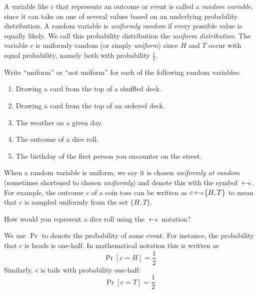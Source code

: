 A variable like $c$ that represents an outcome or event is called a \emph{random 
variable}, since it can take on one of several values based on an underlying 
probability distribution. A random variable is \emph{uniformly random} if every possible 
value is equally likely. We call this probability distribution the 
\emph{uniform distribution}. The variable $c$ is uniformly random (or simply \emph{uniform})
since $H$ and $T$ occur with equal probability, namely both with probability 
$\frac{1}{2}$.

\begin{exercise}
    Write ``uniform'' or ``not uniform'' for each of the following random variables:
    \renewcommand{\labelenumi}{(\alph{enumi})} 
    \begin{enumerate}
        \item Drawing a card from the top of a shuffled deck.
        \item Drawing a card from the top of an ordered deck.
        \item The weather on a given day.
        \item The outcome of a dice roll.
        \item The birthday of the first person you encounter on the street.
    \end{enumerate}
\end{exercise}

When a random variable is uniform, we say it is chosen \emph{uniformly at random} 
(sometimes shortened to chosen \emph{uniformly}) and denote this with the symbol 
$\hskip2.3pt{\gets\!\!\mbox{\tiny${\$}$\normalsize}}\,$. For example, the outcome $c$ of a coin toss can be written as $c \hskip2.3pt{\gets\!\!\mbox{\tiny${\$}$\normalsize}}\, 
\{H, T\}$ to mean that $c$ is sampled uniformly from the set $\{H, T\}$. 

\begin{exercise}
    How would you represent a dice roll using the $\hskip2.3pt{\gets\!\!\mbox{\tiny${\$}$\normalsize}}\,$ notation?
\end{exercise}

We use $\Pr$ to denote the probability of some event. For instance, the 
probability that $c$ is heads is one-half. In mathematical notation this
is written as
\[
    \Pr[c=H] = \frac{1}{2}
\]
Similarly, $c$ is tails with probability one-half:
\[
    \Pr[c=T] = \frac{1}{2}
\]

